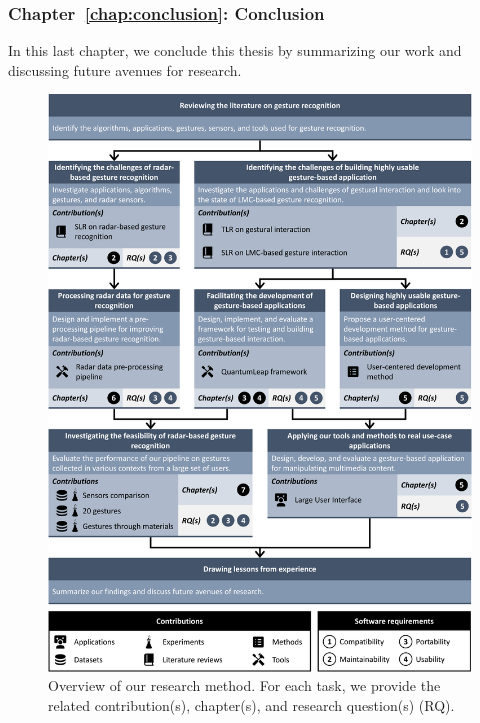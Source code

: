 \subsubsection{Chapter~\ref{chap:conclusion}: Conclusion} 
In this last chapter, we conclude this thesis by summarizing our work and discussing future avenues for research.

\begin{figure}
    \centering
    \includegraphics[width=\linewidth]{Figures/Introduction/graphical-summary.pdf}
    \vspace{-18pt}
    \caption{Overview of our research method. For each task, we provide the related contribution(s), chapter(s), and research question(s) (RQ).}
    \label{fig:graphical-summary}
\end{figure}

